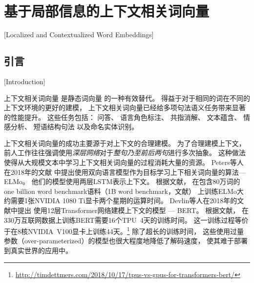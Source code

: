 \newcommand{\chtwoassumption}{不同距离、不同内容的上下文在表示一个词时的相关程度不同}

\chapter{基于局部信息的上下文相关词向量}[Localized and Contextualized Word Embeddings]\label{chp:elmo}

\section{引言}[Introduction]

上下文相关词向量\cite{NIPS2017_7209,peters-EtAl:2018:N18-1,P18-1031,gpt1,DBLP:journals/corr/abs-1810-04805}
是静态词向量\cite{DBLP:journals/corr/abs-1301-3781,NIPS2013_5021,pennington-socher-manning:2014:EMNLP2014,Q17-1010}
的一种有效替代。
得益于对于相同的词在不同的上下文环境的更好的建模，
上下文相关词向量已经给多项句法语义任务带来显著的性能提升。
这些任务包括：
问答\cite{peters-EtAl:2018:N18-1,DBLP:journals/corr/abs-1810-04805}、
语言角色标注\cite{peters-EtAl:2018:N18-1}、
共指消解\cite{lee-etal-2018-higher}、
文本蕴含\cite{peters-EtAl:2018:N18-1,DBLP:journals/corr/abs-1810-04805}、
情感分析\cite{peters-EtAl:2018:N18-1}、
短语结构句法\cite{P18-1249,joshi-peters-hopkins:2018:Long}
以及命名实体识别\cite{peters-EtAl:2017:Long,DBLP:journals/corr/abs-1810-04805}。

上下文相关词向量的成功主要源于对上下文的合理建模。
为了合理建模上下文，前人工作往往强调使用\textit{深层网络}对于\textit{整句乃至前后两句}进行多次抽象。
这种做法使得从大规模文本中学习上下文相关词向量的过程消耗大量的资源。
Peters等人在2018年的文献
中提出使用双向语言模型作为目标学习上下相关词向量的算法—ELMo。
他们的模型使用两层LSTM表示上下文。
根据文献，
在包含80万词的one billion word benchmark语料（1B word benchmark，文献）
上训练ELMo大约需要1张NVIDIA 1080 Ti显卡两个星期的运算时间。
Devlin等人在2018年的文献中提出
使用12层Transformer网络建模上下文的模型 --- BERT。
根据文献，
在330万互联网数据上训练BERT需要16个TPU~4天的训练时间。
这一训练过程等价于在8核NVIDIA~V100显卡上训练44天。\footnote{\url{http://timdettmers.com/2018/10/17/tpus-vs-gpus-for-transformers-bert/}}
除了超长的训练时间，
这些使用过量参数（over-parameterized）的模型也很大程度地降低了解码速度，
使其难于部署到真实世界的应用中。

